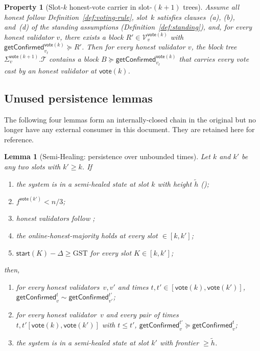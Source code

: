 \ifx\litemode\undefined\documentclass{article}\fi
\newcommand{\T}[0]{\ensuremath{\mathcal{T}}}
\newcommand{\V}[0]{\ensuremath{\mathcal{V}}}
\newcommand{\start}{\ensuremath{\mathsf{start}}}
\newcommand{\vote}{\ensuremath{\mathsf{vote}}}
\newcommand{\GST}{\ensuremath{\mathrm{GST}}\xspace}
\newcommand{\comm}[1]{\ensuremath{\widetilde{#1}}}
\newcommand{\getConfirmed}{\textsf{getConfirmed}\xspace}
\theoremstyle{plain}
\newtheorem{lemma}{Lemma}
\newtheorem{property}[theorem]{Property}
\theoremstyle{definition}
\theoremstyle{remark}
\begin{document}
\begin{property}[Slot-$k$ honest-vote carrier in slot-$(k{+}1)$ trees]\label{prop:vote-carrier}
Assume all honest follow Definition~\ref{def:voting-rule}, slot~$k$ satisfies clauses~(a), (b), and~(d) of the standing assumptions (Definition~\ref{def:standing}), and, for every honest validator $v$, there exists a block $R' \in \V_v^{\vote(k)}$ with $\getConfirmed_{v_\ell}^{\vote(k)} \succeq R'$.
Then for every honest validator $v$, the block tree $\Sigma_v^{\vote(k+1)}.\T$ contains a block $B \succeq \getConfirmed_{v_\ell}^{\vote(k)}$ that carries every vote cast by an honest validator at $\vote(k)$.
\end{property}

\subsection{Unused persistence lemmas}

The following four lemmas form an internally-closed chain in the original  but no longer have any external consumer in this document. They are retained here for reference.

\begin{lemma}[Semi-Healing: persistence over unbounded times]\label{rev:lem:semi-healing-unbounded}
Let $k$ and $k'$ be any two slots with $k'\geq k$.
If
\begin{enumerate}
  \item\label{rev:shu:hs} the system is in a semi-healed state at slot $k$ with height $\comm{h}$ ();
  \item\label{rev:shu:f-bound} $f^{\vote(k')}< n/3$;
  \item\label{rev:shu:f} honest validators follow ;
  \item\label{rev:shu:ohm} the online-honest-majority holds at every slot $\in [k,k']$;
  \item\label{rev:shu:sync} $\start(K) - \Delta \geq \GST$ for every slot $K \in [k,k']$;
\end{enumerate}
then,
\begin{enumerate}
  \item for every honest validators~$v,v'$ and times $t, t' \in [\vote(k),\vote(k')]$, $\getConfirmed_v^{t} \sim \getConfirmed_{v'}^{t'}$;
  \item for every honest validator~$v$ and every pair of times $t, t' [\vote(k),\vote(k')]$ with $t \leq t'$, $\getConfirmed_v^{t'} \succeq \getConfirmed_v^t$;
  \item the system is in a semi-healed state at slot $k'$ with frontier $\geq \comm{h}$.
\end{enumerate}
\end{lemma}
\end{document}
